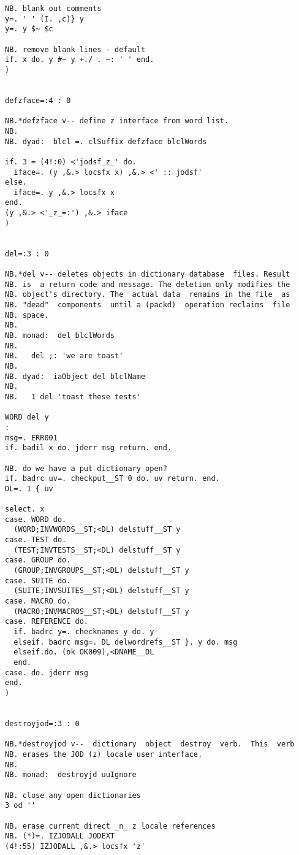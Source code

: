 \begin{lstlisting}[frame=single,framerule=0pt,basicstyle=\ttfamily\tiny]
NB. blank out comments                                           
y=. ' ' (I. ,c)} y                                     
y=. y $~ $c                                                    
                                                                 
NB. remove blank lines - default                                 
if. x do. y #~ y +./ . ~: ' ' end.                            
)


defzface=:4 : 0

NB.*defzface v-- define z interface from word list.
NB.
NB. dyad:  blcl =. clSuffix defzface blclWords

if. 3 = (4!:0) <'jodsf_z_' do. 
  iface=. (y ,&.> locsfx x) ,&.> <' :: jodsf'
else.
  iface=. y ,&.> locsfx x
end.
(y ,&.> <'_z_=:') ,&.> iface
)


del=:3 : 0

NB.*del v-- deletes objects in dictionary database  files. Result
NB. is  a return code and message. The deletion only modifies the
NB. object's directory. The  actual data  remains in the file  as
NB. "dead"  components  until a (packd)  operation reclaims  file
NB. space.
NB.
NB. monad:  del blclWords
NB.
NB.   del ;: 'we are toast'
NB.
NB. dyad:  iaObject del blclName
NB.
NB.   1 del 'toast these tests'

WORD del y
:
msg=. ERR001
if. badil x do. jderr msg return. end.

NB. do we have a put dictionary open?
if. badrc uv=. checkput__ST 0 do. uv return. end.
DL=. 1 { uv

select. x
case. WORD do.
  (WORD;INVWORDS__ST;<DL) delstuff__ST y
case. TEST do.
  (TEST;INVTESTS__ST;<DL) delstuff__ST y
case. GROUP do.
  (GROUP;INVGROUPS__ST;<DL) delstuff__ST y
case. SUITE do.
  (SUITE;INVSUITES__ST;<DL) delstuff__ST y
case. MACRO do.
  (MACRO;INVMACROS__ST;<DL) delstuff__ST y
case. REFERENCE do.
  if. badrc y=. checknames y do. y
  elseif. badrc msg=. DL delwordrefs__ST }. y do. msg
  elseif.do. (ok OK009),<DNAME__DL
  end.
case. do. jderr msg
end.
)


destroyjod=:3 : 0

NB.*destroyjod v--  dictionary  object  destroy  verb.  This  verb
NB. erases the JOD (z) locale user interface.
NB.
NB. monad:  destroyjd uuIgnore

NB. close any open dictionaries
3 od ''

NB. erase current direct _n_ z locale references
NB. (*)=. IZJODALL JODEXT
(4!:55) IZJODALL ,&.> locsfx 'z'


\end{lstlisting}
